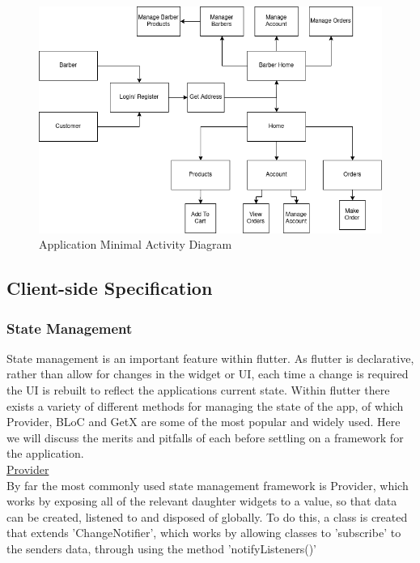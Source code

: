 \documentclass[12pt]{article}
\begin{document}
 	
 	\begin{figure}[H]
 		\centering
 		\includegraphics[scale=0.6]{images/activities.png}
 		\caption{Application Minimal Activity Diagram}
 		\label{fig:activities}
 	\end{figure}
	 
	

	
	\subsection{Client-side Specification}


	
	

	

	
	
	\subsubsection{State Management}
	State management is an important feature within flutter. As flutter is declarative, rather than allow for changes in the widget or UI, each time a change is required the UI is rebuilt to reflect the applications current state. Within flutter there exists a variety of different methods for managing the state of the app, of which Provider, BLoC and GetX are some of the most popular and widely used. Here we will discuss the merits and pitfalls of each before settling on a framework for the application.
	\\
	
	\noindent \underline{Provider}
	\\
	\noindent
	By far the most commonly used state management framework is Provider, which works by exposing all of the relevant daughter widgets to a value, so that data can be created, listened to and disposed of globally. To do this, a class is created that extends 'ChangeNotifier', which works by allowing classes to 'subscribe' to the senders data, through using the method 'notifyListeners()'
	
\end{document}
